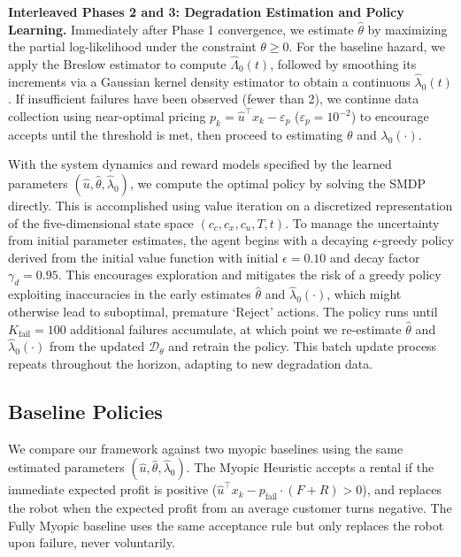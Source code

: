 \documentclass[letterpaper, 10 pt, conference]{IEEEconf}
\begin{document}
\textbf{Interleaved Phases 2 and 3: Degradation Estimation and Policy Learning.} Immediately after Phase 1 convergence, we estimate $\widehat{\theta}$ by maximizing the partial log-likelihood under the constraint $\theta \geq 0$. For the baseline hazard, we apply the Breslow estimator to compute $\widehat{\Lambda}_0(t)$, followed by smoothing its increments via a Gaussian kernel density estimator to obtain a continuous $\widehat{\lambda}_0(t)$. If insufficient failures have been observed (fewer than 2), we continue data collection using near-optimal pricing $p_k = \widehat{u}^\top x_k - \varepsilon_p$ ($\varepsilon_p=10^{-2}$) to encourage accepts until the threshold is met, then proceed to estimating $\theta$ and $\lambda_0(\cdot)$.

With the system dynamics and reward models specified by the learned parameters $(\widehat u, \widehat\theta, \widehat\lambda_0)$, we compute the optimal policy by solving the SMDP directly. This is accomplished using value iteration on a discretized representation of the five-dimensional state space $(c_c, c_x, c_u, T, t)$. To manage the uncertainty from initial parameter estimates, the agent begins with a decaying $\epsilon$-greedy policy derived from the initial value function with initial $\epsilon = 0.10$ and decay factor $\gamma_d=0.95$. This encourages exploration and mitigates the risk of a greedy policy exploiting inaccuracies in the early estimates  $\widehat\theta$ and $\widehat\lambda_0(\cdot)$, which might otherwise lead to suboptimal, premature `Reject' actions. The policy runs until $K_{\mathrm{fail}}=100$ additional failures accumulate, at which point we re-estimate $\widehat{\theta}$ and $\widehat{\lambda}_0(\cdot)$ from the updated $\mathcal{D}_\theta$ and retrain the policy.  This batch update process repeats throughout the horizon, adapting to new degradation data.

\subsection{Baseline Policies}
We compare our framework against two myopic baselines using the same estimated parameters $(\widehat{u}, \widehat{\theta}, \widehat{\lambda}_0)$. The Myopic Heuristic accepts a rental if the immediate expected profit is positive ($\widehat{u}^\top x_k - p_{\text{fail}} \cdot (F + R) > 0$), and replaces the robot when the expected profit from an average customer turns negative. The Fully Myopic baseline uses the same acceptance rule but only replaces the robot upon failure, never voluntarily.
\end{document}
